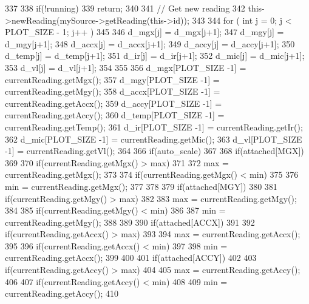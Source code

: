 \begin{DoxyCode}
337 {
338     if(!running)
339         return;
340 
341     // Get new reading
342     this->newReading(mySource->getReading(this->id));
343 
344         for ( int j = 0; j < PLOT_SIZE - 1; j++ )
345         {
346             d_mgx[j] = d_mgx[j+1];
347             d_mgy[j] = d_mgy[j+1];
348             d_accx[j] = d_accx[j+1];
349             d_accy[j] = d_accy[j+1];
350             d_temp[j] = d_temp[j+1];
351             d_ir[j] = d_ir[j+1];
352             d_mic[j] = d_mic[j+1];
353             d_vl[j] = d_vl[j+1];
354         }
355 
356         d_mgx[PLOT_SIZE -1] = currentReading.getMgx();
357         d_mgy[PLOT_SIZE -1] = currentReading.getMgy();
358         d_accx[PLOT_SIZE -1] = currentReading.getAccx();
359         d_accy[PLOT_SIZE -1] = currentReading.getAccy();
360         d_temp[PLOT_SIZE -1] = currentReading.getTemp();
361         d_ir[PLOT_SIZE -1] = currentReading.getIr();
362         d_mic[PLOT_SIZE -1] = currentReading.getMic();
363         d_vl[PLOT_SIZE -1] = currentReading.getVl();
364 
366         if(auto_scale)
367         {
368             if(attached[MGX])
369             {
370                 if(currentReading.getMgx() > max)
371                 {
372                     max = currentReading.getMgx();
373                 }
374                 if(currentReading.getMgx() < min)
375                 {
376                     min = currentReading.getMgx();
377                 }
378             }
379             if(attached[MGY])
380             {
381                 if(currentReading.getMgy() > max)
382                 {
383                     max = currentReading.getMgy();
384                 }
385                 if(currentReading.getMgy() < min)
386                 {
387                     min = currentReading.getMgy();
388                 }
389             }
390             if(attached[ACCX])
391             {
392                 if(currentReading.getAccx() > max)
393                 {
394                     max = currentReading.getAccx();
395                 }
396                 if(currentReading.getAccx() < min)
397                 {
398                     min = currentReading.getAccx();
399                 }
400             }
401             if(attached[ACCY])
402             {
403                 if(currentReading.getAccy() > max)
404                 {
405                     max = currentReading.getAccy();
406                 }
407                 if(currentReading.getAccy() < min)
408                 {
409                     min = currentReading.getAccy();
410                 }
}}}
\end{DoxyCode}
